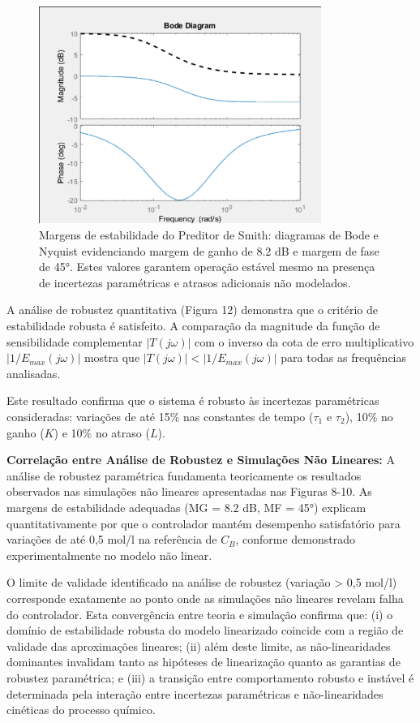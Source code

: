 \documentclass[a4paper,12pt]{article}
\begin{document}
  \begin{figure}[H]
  \centering
  \includegraphics[width=0.82\textwidth]{figure10.png}
  \caption{Margens de estabilidade do Preditor de Smith: diagramas de Bode e Nyquist evidenciando margem de ganho de 8.2 dB e margem de fase de 45°. Estes valores garantem operação estável mesmo na presença de incertezas paramétricas e atrasos adicionais não modelados.}
  \end{figure}

A análise de robustez quantitativa (Figura 12) demonstra que o critério de estabilidade robusta é satisfeito. A comparação da magnitude da função de sensibilidade complementar $|T(j\omega)|$ com o inverso da cota de erro multiplicativo $|1/E_{max}(j\omega)|$ mostra que $|T(j\omega)| < |1/E_{max}(j\omega)|$ para todas as frequências analisadas.

Este resultado confirma que o sistema é robusto às incertezas paramétricas consideradas: variações de até 15\% nas constantes de tempo ($\tau_1$ e $\tau_2$), 10\% no ganho ($K$) e 10\% no atraso ($L$). 

\textbf{Correlação entre Análise de Robustez e Simulações Não Lineares:}
A análise de robustez paramétrica fundamenta teoricamente os resultados observados nas simulações não lineares apresentadas nas Figuras 8-10. As margens de estabilidade adequadas (MG = 8.2 dB, MF = 45°) explicam quantitativamente por que o controlador mantém desempenho satisfatório para variações de até 0,5 mol/l na referência de $C_B$, conforme demonstrado experimentalmente no modelo não linear.

O limite de validade identificado na análise de robustez (variação > 0,5 mol/l) corresponde exatamente ao ponto onde as simulações não lineares revelam falha do controlador. Esta convergência entre teoria e simulação confirma que: (i) o domínio de estabilidade robusta do modelo linearizado coincide com a região de validade das aproximações lineares; (ii) além deste limite, as não-linearidades dominantes invalidam tanto as hipóteses de linearização quanto as garantias de robustez paramétrica; e (iii) a transição entre comportamento robusto e instável é determinada pela interação entre incertezas paramétricas e não-linearidades cinéticas do processo químico.
\end{document}
